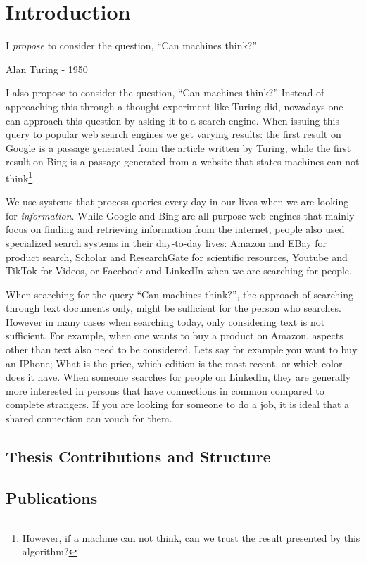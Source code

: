 \chapter{Introduction}
\epigraph{I \textit{propose} to consider the question, ``Can machines think?''}{Alan Turing - 1950}

I also propose to consider the question, ``Can machines think?'' Instead of approaching this through a thought experiment like Turing did, nowadays one can approach this question by asking it to a search engine. When issuing this query to popular web search engines we get varying results: the first result on Google is a passage generated from the article written by Turing, while the first result on Bing is a passage generated from a website that states machines can not think\footnote{However, if a machine can not think, can we trust the result presented by this algorithm?}.

We use systems that process queries every day in our lives when we are looking for \textit{information}. While Google and Bing are all purpose web engines that mainly focus on finding and retrieving information from the internet, people also used specialized search systems in their day-to-day lives: Amazon and EBay for product search, Scholar and ResearchGate for scientific resources, Youtube and TikTok for Videos, or Facebook and LinkedIn when we are searching for people.

When searching for the query ``Can machines think?'', the approach of searching through text documents only, might be sufficient for the person who searches. However in many cases when searching today, only considering text is not sufficient. For example, when one wants to buy a product on Amazon, aspects other than text also need to be considered. Lets say for example you want to buy an IPhone; What is the price, which edition is the most recent, or which color does it have. When someone searches for people on LinkedIn, they are generally more interested in persons that have connections in common compared to complete strangers. If you are looking for someone to do a job, it is ideal that a shared connection can vouch for them. 

\section{Thesis Contributions and Structure}

\section{Publications}